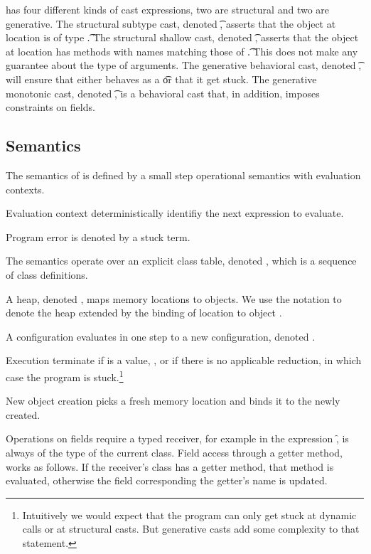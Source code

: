 \documentclass[a4paper,USenglish]{tex/lipics-v2016}
\begin{document}


\name has four different kinds of cast expressions, two are structural and
two are generative. The structural subtype cast, denoted \SubCast\t\a,
asserts that the object at location \a is of type \t.  The structural
shallow cast, denoted \ShaCast\t\a, asserts that the object at location \a
has methods with names matching those of \t. This does not make any
guarantee about the type of arguments.  The generative behavioral cast,
denoted \BehCast\t\a, will ensure that either \a behaves as a \t or that it
get stuck. The generative monotonic cast, denoted \MonCast\t\a, is a
behavioral cast that, in addition, imposes constraints on fields.


\subsection{Semantics}

The semantics of \name is defined by a small step operational semantics with
evaluation contexts.

Evaluation context deterministically identifiy the next expression to evaluate.

Program error is denoted by a stuck term.

The semantics operate over an explicit class table, denoted \K, which is a
sequence of class definitions.

A heap, denoted \s, maps memory locations to
objects. We use the notation \Heap\s{\Bind\a{\obj\C{\b\a}}} to denote the
heap \s extended by the binding of location \a to object \obj\C{\b\a}.

A configuration \K\e\s evaluates in one step to a new configuration, denoted
\Reduce \K\e\s \Kp\ep\sp.

Execution terminate if \ep\xspace is a value, \a, or if there is no applicable
reduction, in which case the program is stuck.\footnote{Intuitively we would
  expect that the program can only get stuck at dynamic calls or at
  structural casts. But generative casts add some complexity to that
  statement.}

New object creation picks a fresh memory location  and binds it to the
newly created.

Operations on fields require a typed receiver, for example in the expression
\Get\this\f, \this is always of the type of the current class. Field access
through a getter method, works as follows. If the receiver's class has a
getter method, that method is evaluated, otherwise the field corresponding
the getter's name is updated.
\end{document}
